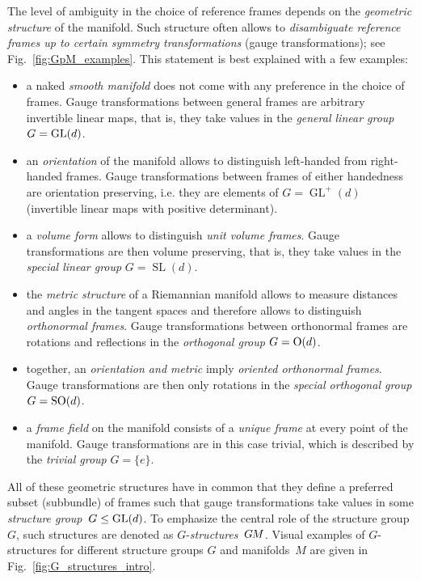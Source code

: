 The level of ambiguity in the choice of reference frames depends on the \emph{geometric structure} of the manifold.
Such structure often allows to
\emph{disambiguate reference frames up to certain symmetry transformations} (gauge transformations); see Fig.~\ref{fig:GpM_examples}.
This statement is best explained with a few examples:
\begin{itemize}[leftmargin=1.2cm]
\item[{\rule[2.2pt]{2pt}{2pt}}]
    a naked \emph{smooth manifold} does not come with any preference in the choice of frames.
    Gauge transformations between general frames are arbitrary invertible linear maps, that is, they take values in the \emph{general linear group} ${G=\operatorname{GL}(d)}$.
\item[{\rule[2.2pt]{2pt}{2pt}}]
    an \emph{orientation} of the manifold allows to distinguish left-handed from right-handed frames.
    Gauge transformations between frames of either handedness are orientation preserving, i.e. they are elements of ${G=\operatorname{GL}^+(d)}$ (invertible linear maps with positive determinant).
\item[{\rule[2.2pt]{2pt}{2pt}}]
    a \emph{volume form} allows to distinguish \emph{unit volume frames}.
    Gauge transformations are then volume preserving, that is, they take values in the \emph{special linear group} $G=\operatorname{SL}(d)$.
\item[{\rule[2.2pt]{2pt}{2pt}}]
    the \emph{metric structure} of a Riemannian manifold allows to measure distances and angles in the tangent spaces and therefore allows to distinguish \emph{orthonormal frames}.
    Gauge transformations between orthonormal frames are rotations and reflections in the \emph{orthogonal group} $G=\operatorname{O}(d)$.
\item[{\rule[2.2pt]{2pt}{2pt}}]
    together, an \emph{orientation and metric} imply \emph{oriented orthonormal frames}.
    Gauge transformations are then only rotations in the \emph{special orthogonal group} $G=\operatorname{SO}(d)$.
\item[{\rule[2.2pt]{2pt}{2pt}}]
    a \emph{frame field} on the manifold consists of a \emph{unique frame} at every point of the manifold.
    Gauge transformations are in this case trivial, which is described by the \emph{trivial group} $G=\{e\}$.
\end{itemize}
All of these geometric structures have in common that they define a preferred subset (subbundle) of frames such that gauge transformations take values in some \emph{structure group}~$G\leq\operatorname{GL}(d)$.
To emphasize the central role of the structure group $G$, such structures are denoted as $G$-\emph{structures}~$G\mkern-1.4muM$.
Visual examples of $G$-structures for different structure groups $G$ and manifolds~$M$ are given in Fig.~\ref{fig:G_structures_intro}.


